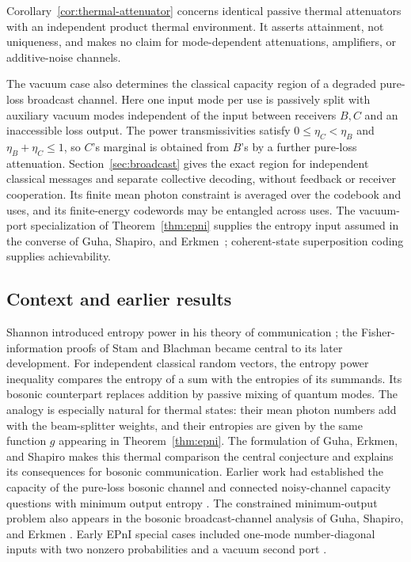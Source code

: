 Corollary~\ref{cor:thermal-attenuator} concerns identical passive thermal attenuators with an independent product thermal environment. It asserts attainment, not uniqueness, and makes no claim for mode-dependent attenuations, amplifiers, or additive-noise channels.

The vacuum case also determines the classical capacity region of a
degraded pure-loss broadcast channel. Here one input mode per use is
passively split with auxiliary vacuum modes independent of the input
between receivers \(B,C\) and an inaccessible loss output. The power
transmissivities satisfy
\(0\le\eta_C<\eta_B\) and \(\eta_B+\eta_C\le1\), so \(C\)'s marginal
is obtained from \(B\)'s by a further pure-loss attenuation.
Section~\ref{sec:broadcast} gives the exact region for independent
classical messages and separate collective decoding, without feedback
or receiver cooperation. Its finite mean photon constraint is averaged
over the codebook and uses, and its finite-energy codewords may be
entangled across uses. The vacuum-port specialization of
Theorem~\ref{thm:epni} supplies the entropy input assumed in the
converse of Guha, Shapiro, and Erkmen~\cite{GSE2007};
coherent-state superposition coding supplies achievability.

\subsection{Context and earlier results}
Shannon introduced entropy power in his theory of communication
\cite{Shannon1948}; the Fisher-information proofs of Stam and Blachman
\cite{Stam1959,Blachman1965} became central to its later development.
For independent classical random vectors, the entropy power inequality
compares the entropy of a sum with the entropies of its summands. Its
bosonic counterpart replaces addition by passive mixing of quantum modes.
The analogy is especially natural for thermal states: their mean photon
numbers add with the beam-splitter weights, and their entropies are given
by the same function \(g\) appearing in Theorem~\ref{thm:epni}.
The formulation of Guha, Erkmen, and Shapiro
\cite[Section~II.B]{GES2007} makes this thermal comparison the central
conjecture and explains its consequences for bosonic communication.
Earlier work had established the capacity of the pure-loss bosonic channel
\cite{GGLMSY2004} and connected noisy-channel capacity questions with
minimum output entropy \cite{GGLMS2004}. The constrained minimum-output
problem also appears in the bosonic broadcast-channel analysis of Guha,
Shapiro, and Erkmen \cite{GSE2007}. Early EPnI special cases included
one-mode number-diagonal inputs with two nonzero probabilities and a
vacuum second port \cite{DSM2011}.

